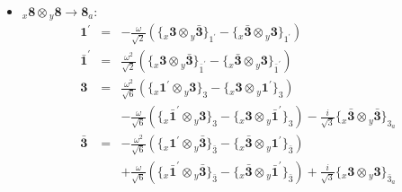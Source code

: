 \documentclass[english]{article}
\newcommand{\rep}[1]{\mathbf{#1}}
\newcommand{\repx}[2]{{}_{#2}\mathbf{#1}}
\newcommand{\subcg}[3]{\big\{ \repx{#1}{x}\otimes\repx{#2}{y}\big\}^{}_{#3}}
\begin{document}
\begin{itemize}
\item $\repx{8}{x}\otimes\repx{8}{y}\to\rep{8}_{a}$:
\begin{eqnarray*}
\rep{1^{\prime}} &=& -\frac{\omega }{\sqrt{2}}\left(\subcg{3}{\bar{3}}{1^{\prime}}-\subcg{\bar{3}}{3}{1^{\prime}}\right)
\\
\rep{\bar{1}^{\prime}} &=& \frac{\omega ^2}{\sqrt{2}}\left(\subcg{3}{\bar{3}}{\bar{1}^{\prime}}-\subcg{\bar{3}}{3}{\bar{1}^{\prime}}\right)
\\
\rep{3} &=& \frac{\omega ^2}{\sqrt{6}}\left(\subcg{1^{\prime}}{3}{3}-\subcg{3}{1^{\prime}}{3}\right) \\ 
 & & -\frac{\omega }{\sqrt{6}}\left(\subcg{\bar{1}^{\prime}}{3}{3}-\subcg{3}{\bar{1}^{\prime}}{3}\right)-\frac{i}{\sqrt{3}}\subcg{\bar{3}}{\bar{3}}{3_{a}}
\\
\rep{\bar{3}} &=& -\frac{\omega ^2}{\sqrt{6}}\left(\subcg{1^{\prime}}{\bar{3}}{\bar{3}}-\subcg{\bar{3}}{1^{\prime}}{\bar{3}}\right) \\ 
 & & +\frac{\omega }{\sqrt{6}}\left(\subcg{\bar{1}^{\prime}}{\bar{3}}{\bar{3}}-\subcg{\bar{3}}{\bar{1}^{\prime}}{\bar{3}}\right)+\frac{i}{\sqrt{3}}\subcg{3}{3}{\bar{3}_{a}}
\end{eqnarray*}
\end{itemize}
\end{document}
